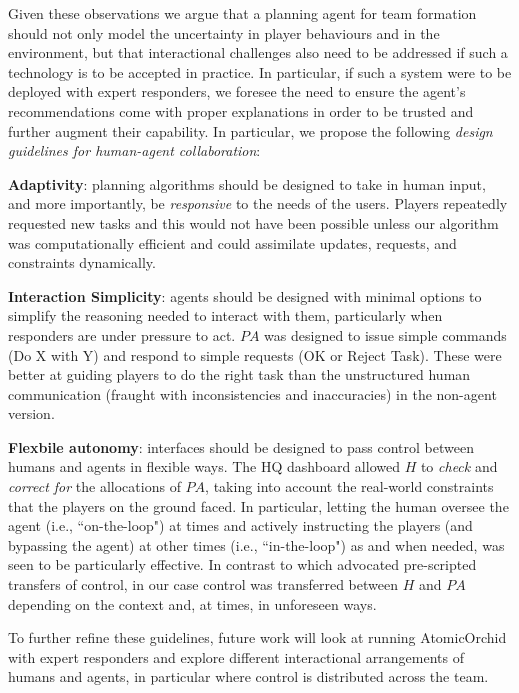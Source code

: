 Given these observations we argue that a planning agent for team formation should not only model the uncertainty in player behaviours and in the environment, but that interactional challenges also need to be addressed  if such a technology is to be accepted in practice. In particular, if such a system were to be deployed with expert responders, we foresee the need to ensure the agent's recommendations come with proper explanations in order to be trusted and further augment their capability. In particular, we propose the following \textit{design guidelines for human-agent collaboration}:

\noindent \textbf{Adaptivity}:  planning algorithms should be designed to take in human input, and more importantly, be \emph{responsive} to the needs of the users. Players repeatedly requested new tasks and this would not have been possible unless our algorithm  was computationally efficient  and could  assimilate updates, requests, and constraints dynamically. 

\noindent \textbf{Interaction Simplicity}:  agents should be designed with minimal options to simplify the reasoning needed to interact with them, particularly when responders are under pressure to act. $PA$ was designed to issue simple commands (Do X with Y) and respond to simple requests (OK or Reject Task). These were better at guiding players to do the right task than the unstructured human communication (fraught with inconsistencies and inaccuracies) in the non-agent version. 

\noindent \textbf{Flexbile autonomy}: interfaces should be designed to pass control between humans and agents in flexible ways. The HQ dashboard allowed $H$ to \emph{check} and \emph{correct for} the allocations of $PA$, taking into account the real-world constraints that the players on the ground faced. In particular, letting the human oversee the agent (i.e., ``on-the-loop") at times and actively instructing  the players (and bypassing the agent) at other times (i.e., ``in-the-loop") as and when needed, was seen to be particularly effective. In contrast to \cite{scerri:etal:2005} which advocated pre-scripted transfers of control, in our case  control was transferred between $H$ and $PA$ depending on the context and, at times, in unforeseen ways.

To further refine these guidelines, future work will look at running AtomicOrchid with expert responders and explore different interactional arrangements of humans and agents, in particular where control is distributed across the team.\vspace{-1mm}